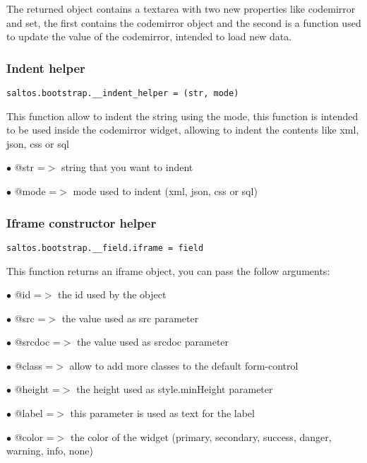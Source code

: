 \documentclass[a4paper]{article}
\begin{document}
The returned object contains a textarea with two new properties like codemirror and set,
the first contains the codemirror object and the second is a function used to update the
value of the codemirror, intended to load new data.

\hypertarget{toc619}{}
\subsubsection{Indent helper}

\begin{lstlisting}
saltos.bootstrap.__indent_helper = (str, mode)
\end{lstlisting}

This function allow to indent the string using the mode, this function is
intended to be used inside the codemirror widget, allowing to indent the
contents like xml, json, css or sql

\begin{compactitem}
\item[\color{myblue}$\bullet$] @str  =$>$ string that you want to indent
\item[\color{myblue}$\bullet$] @mode =$>$ mode used to indent (xml, json, css or sql)
\end{compactitem}

\hypertarget{toc620}{}
\subsubsection{Iframe constructor helper}

\begin{lstlisting}
saltos.bootstrap.__field.iframe = field
\end{lstlisting}

This function returns an iframe object, you can pass the follow arguments:

\begin{compactitem}
\item[\color{myblue}$\bullet$] @id     =$>$ the id used by the object
\item[\color{myblue}$\bullet$] @src    =$>$ the value used as src parameter
\item[\color{myblue}$\bullet$] @srcdoc =$>$ the value used as srcdoc parameter
\item[\color{myblue}$\bullet$] @class  =$>$ allow to add more classes to the default form-control
\item[\color{myblue}$\bullet$] @height =$>$ the height used as style.minHeight parameter
\item[\color{myblue}$\bullet$] @label  =$>$ this parameter is used as text for the label
\item[\color{myblue}$\bullet$] @color  =$>$ the color of the widget (primary, secondary, success, danger, warning, info, none)
\end{compactitem}
\end{document}

